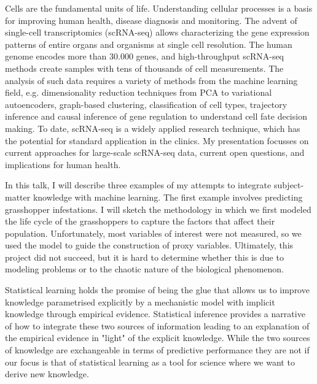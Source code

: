 \documentclass[a4paper,UKenglish]{dagrep-v2021}
\begin{document}
Cells are the fundamental units of life. Understanding cellular processes is a basis for improving human health, disease diagnosis and monitoring. The advent of single-cell transcriptomics (scRNA-seq) allows characterizing the gene expression patterns of entire organs and organisms at single cell resolution. The human genome encodes more than 30.000 genes, and high-throughput scRNA-seq methods create samples with tens of thousands of cell measurements. The analysis of such data requires a variety of methods from the machine learning field, e.g. dimensionality reduction techniques from PCA to variational autoencoders, graph-based clustering, classification of cell types, trajectory inference and causal inference of gene regulation to understand cell fate decision making. To date, scRNA-seq is a widely applied research technique, which has the potential for standard application in the clinics.  My presentation focusses on current approaches for large-scale scRNA-seq data, current open questions, and implications for human health.

\license

In this talk, I will describe three examples of my attempts to integrate subject-matter knowledge with machine learning. The first example involves predicting grasshopper infestations. I will sketch the methodology in which we first modeled the life cycle of the grasshoppers to capture the factors that affect their population. Unfortunately, most variables of interest were not measured, so we used the model to guide the construction of proxy variables. Ultimately, this project did not succeed, but it is hard to determine whether this is due to modeling problems or to the chaotic nature of the biological phenomenon.

\license

Statistical learning holds the promise of being the glue that allows us to improve knowledge parametrised explicitly by a mechanistic model with implicit knowledge through empirical evidence. Statistical inference provides a narrative of how to integrate these two sources of information leading to an explanation of the empirical evidence in "light" of the explicit knowledge. While the two sources of knowledge are exchangeable in terms of predictive performance they are not if our focus is that of statistical learning as a tool for science where we want to derive new knowledge.
\end{document}
